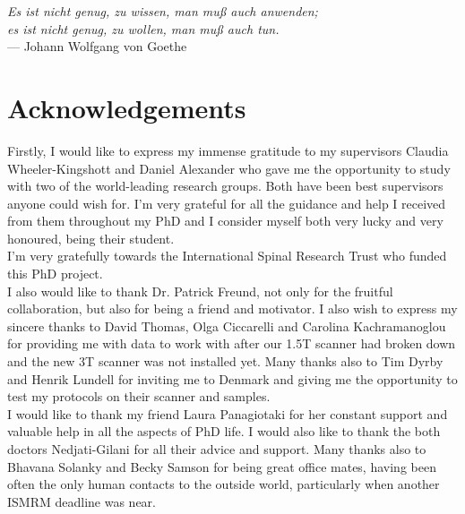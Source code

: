 

\begin{flushright}{\slshape    
Es ist nicht genug, zu wissen, man muß auch anwenden;\\
es ist nicht genug, zu wollen, man muß auch tun.
} \\ \medskip
--- Johann Wolfgang von Goethe
\end{flushright}

\bigskip


\begingroup

\let\clearpage\relax
\let\cleardoublepage\relax
\let\cleardoublepage\relax

\chapter*{Acknowledgements} %

\noindent 
Firstly, I would like to express my immense gratitude to my supervisors Claudia Wheeler-Kingshott and Daniel Alexander who gave me the opportunity to study with two of the world-leading research groups. Both have been best supervisors anyone could wish for. I'm very grateful for all the guidance and help I received from them throughout my PhD and I consider myself both very lucky and very honoured, being their student.\\
\noindent
I'm very gratefully towards the International Spinal Research Trust who funded this PhD project.\\ \medskip
\noindent 
I also would like to thank Dr. Patrick Freund, not only for the fruitful collaboration, but also for being a friend and motivator. I also wish to express my sincere thanks to  David Thomas,  Olga Ciccarelli and Carolina Kachramanoglou for providing me with data to work with after our 1.5T scanner had broken down and the new 3T scanner was not installed yet. Many thanks also to Tim Dyrby and Henrik Lundell for inviting me to Denmark and giving me the opportunity to test my protocols on their scanner and samples.\\

\noindent
I would like to thank my friend Laura Panagiotaki for her constant support and valuable help in all the aspects of PhD life. I would also like to thank the both doctors Nedjati-Gilani for all their advice and support.
Many thanks also to Bhavana Solanky and Becky Samson for being great office mates, having been often the only human contacts to the outside world, particularly when another ISMRM deadline was near. \\

